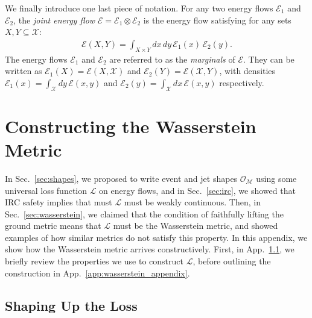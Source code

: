 \documentclass[letterpaper,11pt]{article}
\newcommand{\E}{\mathcal{E}}
\newcommand{\M}{\mathcal{M}}
\newcommand{\X}{\mathcal{X}}
\renewcommand{\O}{\mathcal{O}}
\DeclareRobustCommand{\Sec}[1]{Sec.~\ref{sec:#1}}
\DeclareRobustCommand{\App}[1]{App.~\ref{app:#1}}
\begin{document}
We finally introduce one last piece of notation. For any two energy flows $\E_1$ and $\E_2$, the \emph{joint energy flow} $\E = \E_1 \otimes \E_2$ is the energy flow satisfying for any sets $X, Y \subseteq \X$:
%
\begin{align}
    \E(X, Y) = \int_{X\times Y} dx \, dy\, \E_1(x) \, \E_2(y).
\end{align}
%
The energy flows $\E_1$ and $\E_2$ are referred to as the \emph{marginals} of $\E$. They can be written as $\E_1(X) = \E(X, \mathcal{X})$ and $\E_2(Y) = \E(\mathcal{X}, Y)$, with densities $\E_1(x) = \int_\mathcal{X}dy\, \E(x,y)$ and $\E_2(y) = \int_\mathcal{X}dx\, \E(x,y)$ respectively.


\section{Constructing the Wasserstein Metric}\label{app:construction}


In \Sec{shapes}, we proposed to write event and jet shapes $\O_\M$ using some universal loss function $\mathcal{L}$ on energy flows, and in \Sec{irc}, we showed that IRC safety implies that must $\mathcal{L}$ must be weakly continuous. Then, in \Sec{wasserstein}, we claimed that the condition of faithfully lifting the ground metric means that $\mathcal{L}$ must be the Wasserstein metric, and showed examples of how similar metrics do not satisfy this property. In this appendix, we show how the Wasserstein metric arrives constructively. First, in \App{loss}, we briefly review the properties we use to construct $\mathcal{L}$, before outlining the construction in \App{wasserstein_appendix}.


\subsection{Shaping Up the Loss}\label{app:loss}
\end{document}
